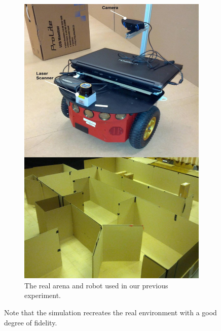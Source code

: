 \documentclass[a4paper,12pt,oneside,openright]{bhamthesis}
\begin{document}
\begin{figure}
\begin{subfigure}[b]{0.35\textwidth}
		\includegraphics[width=\textwidth]{chapter4_fig/arena_real.jpeg}
		\caption{The real arena and robot used in our previous experiment.}
		\label{subfig:arena_real_exp2}
	\end{subfigure}
	\hfill
	\caption{Note that the simulation recreates the real environment with a good degree of fidelity.}
	\label{fig:arenas_exp2}
\end{figure}
\end{document}
